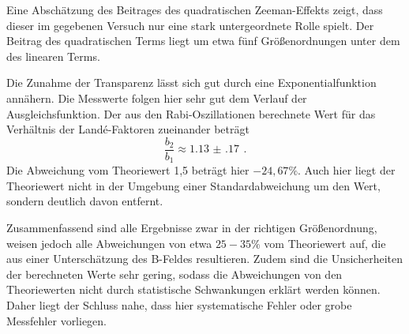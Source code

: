 Eine Abschätzung des Beitrages des quadratischen Zeeman-Effekts zeigt, dass
dieser im gegebenen Versuch nur eine stark untergeordnete Rolle spielt. Der Beitrag des
quadratischen Terms liegt um etwa fünf Größenordnungen unter dem des linearen Terms.

Die Zunahme der Transparenz lässt sich gut durch eine Exponentialfunktion
annähern. Die Messwerte folgen hier sehr gut dem Verlauf der Ausgleichsfunktion.
Der aus den Rabi-Oszillationen berechnete Wert für das Verhältnis der Landé-Faktoren zueinander
beträgt
\begin{equation*}
  \frac{b_2}{b_1}\approx\SI{1.13(17)}{} \,.
\end{equation*}
Die Abweichung vom Theoriewert 1{,}5 beträgt hier $-24{,}67\%$.
Auch hier liegt der Theoriewert nicht in der Umgebung einer Standardabweichung um den Wert, sondern
deutlich davon entfernt.

Zusammenfassend sind alle Ergebnisse zwar in der richtigen Größenordnung, weisen jedoch alle
Abweichungen von etwa $25-35\%$ vom Theoriewert auf, die aus einer Unterschätzung des B-Feldes resultieren.
Zudem sind die Unsicherheiten der berechneten
Werte sehr gering, sodass die Abweichungen von den Theoriewerten nicht durch statistische
Schwankungen erklärt werden können. Daher liegt der Schluss nahe, dass hier systematische Fehler
oder grobe Messfehler vorliegen.

